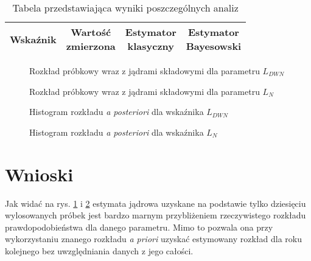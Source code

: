 \documentclass[polish,a4paper,11pt]{mwart}
\let\Oldsection\section
\renewcommand{\section}{\FloatBarrier\Oldsection}
\begin{document}
\begin{table}[!tbh]
  \centering
  \caption{Tabela przedstawiająca wyniki poszczególnych analiz}
  \begin{tabular}{|c|c|c|c|}
    \hline
    Wskaźnik & \makecell{Wartość \\ zmierzona} & \makecell{Estymator \\
    klasyczny} & \makecell{Estymator \\ Bayesowski} \\\hline
    
  \end{tabular}
  \label{tab:wyniki}
\end{table}

\begin{figure}[!tbh]
  \centering
  
  \caption{Rozkład próbkowy wraz z jądrami składowymi dla parametru $L_{DWN}$}
  \label{plot:kernel_ldwn}
\end{figure}

\begin{figure}[!tbh]
  \centering
  
  \caption{Rozkład próbkowy wraz z jądrami składowymi dla parametru $L_{N}$}
  \label{plot:kernel_ln}
\end{figure}

\begin{figure}[!tbh]
  \centering
  
  \caption{Histogram rozkładu \textit{a posteriori} dla wskaźnika $L_{DWN}$}
  \label{plot:hist_ldwn}
\end{figure}

\begin{figure}[!tbh]
  \centering
  
  \caption{Histogram rozkładu \textit{a posteriori} dla wskaźnika $L_{N}$}
  \label{plot:hist_ldwn}
\end{figure}

\section{Wnioski}

Jak widać na rys. \ref{plot:kernel_ldwn} i \ref{plot:kernel_ln} estymata jądrowa
uzyskane na podstawie tylko dziesięciu wylosowanych próbek jest bardzo marnym
przybliżeniem rzeczywistego rozkładu prawdopodobieństwa dla danego parametru.
Mimo to pozwala ona przy wykorzystaniu znanego rozkładu \textit{a priori}
uzyskać estymowany rozkład dla roku kolejnego bez uwzględniania danych z jego
całości.
\end{document}
